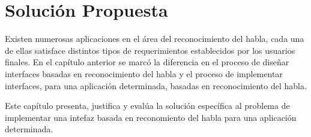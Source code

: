 \chapter{Soluci\'on Propuesta}
\label{sec:solucion}


Existen numerosas aplicaciones en el \'area del reconocimiento del habla, cada una de ellas
satisface distintos tipos de requerimientos establecidos por los usuarios finales. En el
cap\'itulo anterior se marc\'o la diferencia en el proceso de dise\~nar interfaces basadas en reconocimiento
del habla y el proceso de implementar interfaces, para una aplicaci\'on determinada, basadas en reconocimiento del habla.

Este cap\'itulo presenta, justifica y eval\'ua la soluci\'on espec\'ifica al problema de implementar una intefaz
basada en reconomiento del habla para una aplicaci\'on determinada.





